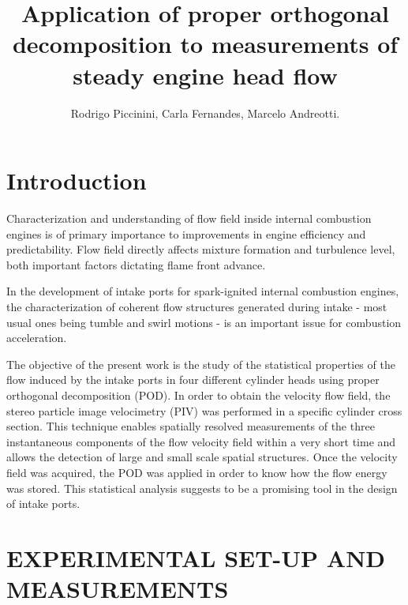 \documentclass[12pt,a4paper]{article}
\title{Application of proper orthogonal decomposition to measurements of steady engine head flow}
\author{Rodrigo Piccinini, Carla Fernandes, Marcelo Andreotti.}
\begin{document}
\maketitle

\doublespacing


\section{Introduction}

Characterization and understanding of flow field inside internal combustion engines is of primary importance to improvements in engine efficiency and predictability. Flow field directly affects mixture formation and turbulence level, both important factors dictating flame front advance.

In the development of intake ports for spark-ignited internal combustion engines, the characterization of coherent flow structures generated during intake - most usual ones being tumble and swirl motions - is an important issue for combustion acceleration. 

The objective of the present work is the study of the statistical properties of the flow induced by the intake ports in four different cylinder heads using proper orthogonal decomposition (POD). In order to obtain the velocity flow field, the stereo particle image velocimetry (PIV) was performed in a specific cylinder cross section. This technique enables spatially resolved measurements of the three instantaneous components of the flow velocity field within a very short time and allows the detection of large and small scale spatial structures. Once the velocity field was acquired, the POD was applied in order to know how the flow energy was stored. This statistical analysis suggests to be a promising tool in the design of intake ports.  


\section{EXPERIMENTAL SET-UP AND MEASUREMENTS}
\end{document}
